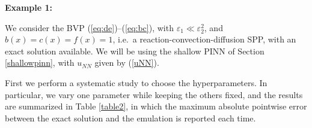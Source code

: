 \documentclass[11pt]{article}
\providecommand{\e}{\varepsilon}
\theoremstyle{plain}
\theoremstyle{definition}
\theoremstyle{remark}
\numberwithin{equation}{section}
\begin{document}
\vspace{0.2cm}

\noindent
\textbf{Example 1:} 
\vspace{0.2cm}

\noindent
We consider the BVP (\ref{eq:de})--(\ref{eq:bc}), with $\e_1\ll \e^2_2$, and $ b(x)=c(x)=f(x)=1$, i.e.~a reaction-convection-diffusion SPP, with an exact solution available. We will be using the shallow PINN of Section \ref{shallowpinn}, with $u_{NN}$ given by (\ref{uNN}).

First we perform a systematic study to choose the hyperparameters. In particular, we vary one parameter while keeping the others fixed, and the results are summarized in Table \ref{table2}, in which the maximum absolute pointwise error between the exact solution and the emulation is reported each time.
\end{document}
